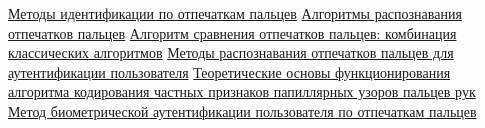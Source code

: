 \documentclass{article}
\begin{document}
\begin{thebibliography}{9}
     \bibitem{}  \href{https://network-journal.mpei.ac.ru/ru/27/13/6/article.htm}{Методы идентификации по отпечаткам пальцев}
     \bibitem{}  \href{https://cyberleninka.ru/article/n/algoritmy-raspoznavaniya-otpechatkov-paltsev}{Алгоритмы распознавания отпечатков пальцев}
     \bibitem{}  \href{https://habr.com/ru/companies/samsung/articles/842578/}{Алгоритм сравнения отпечатков пальцев: комбинация классических алгоритмов}
     \bibitem{} \href{https://www.elibrary.ru/download/elibrary_42560367_93751199.pdf}{Методы распознавания отпечатков пальцев для аутентификации пользователя}
     \bibitem{}  \href{https://elibrary.ru/download/elibrary_44466095_76421639.pdf}{Теоретические основы функционирования алгоритма кодирования частных признаков папиллярных узоров пальцев рук}
     \bibitem{}  \href{https://elibrary.ru/download/elibrary_24994983_78627145.pdf}{Метод биометрической аутентификации пользователя по отпечаткам пальцев}
     
\end{thebibliography}
\end{document}
